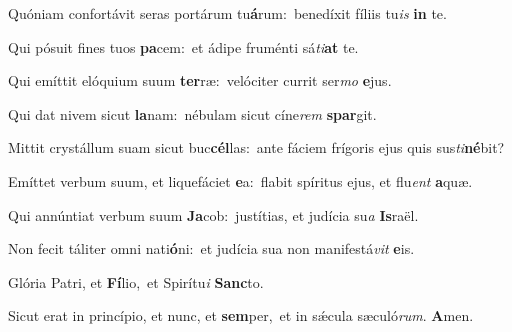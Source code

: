 \setcounter{versecount}{2}

\vs Quóniam confortávit seras portárum tu\textbf{á}rum:~\redgreheightstar benedíxit fíliis tu\textit{is} \textbf{in} te.

\vs Qui pósuit fines tuos \textbf{pa}cem:~\redgreheightstar et ádipe fruménti sá\textit{ti}\textbf{at} te.

\vs Qui emíttit elóquium suum \textbf{ter}ræ:~\redgreheightstar velóciter currit ser\textit{mo} \textbf{e}jus.

\vs Qui dat nivem sicut \textbf{la}nam:~\redgreheightstar nébulam sicut cíne\textit{rem} \textbf{spar}git.

\vs Mittit crystállum suam sicut buc\textbf{cél}las:~\redgreheightstar ante fáciem frígoris ejus quis sus\textit{ti}\textbf{né}bit?

\vs Emíttet verbum suum, et liquefáciet \textbf{e}a:~\redgreheightstar flabit spíritus ejus, et flu\textit{ent} \textbf{a}quæ.

\vs Qui annúntiat verbum suum \textbf{Ja}cob:~\redgreheightstar justítias, et judícia su\textit{a} \textbf{Is}raël.

\vs Non fecit táliter omni nati\textbf{ó}ni:~\redgreheightstar et judícia sua non manifestá\textit{vit} \textbf{e}is.

\vs Glória Patri, et \textbf{Fí}lio,~\redgreheightstar et Spirítu\textit{i} \textbf{Sanc}to.

\vs Sicut erat in princípio, et nunc, et \textbf{sem}per,~\redgreheightstar et in sǽcula sæculó\textit{rum}. \textbf{A}men.

